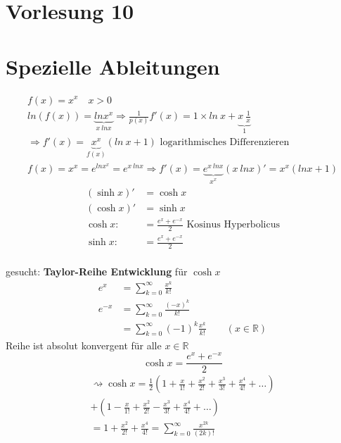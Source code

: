 \section{Vorlesung 10}
\section{Spezielle Ableitungen }
\begin{gather*}
f(x) = x^x \quad x>0\\
ln(f(x)) = \underbrace{ln  x^x}_{x \: ln  x } \Rightarrow \frac{1}{p(x)}f'(x) = 1 \times ln \ x + \underbrace{x \ \frac{1}{x}}_{1}\\
\Rightarrow f'(x) = \underbrace{x^x }_{f(x)}(ln \ x + 1) \text{ logarithmisches Differenzieren }\\
f(x) = x^x = e^{ln  x^x} = e^{x \ ln x} \Rightarrow f'(x)= \underbrace{e^{x \ ln  x}}_{x^x}(x \ ln  x)' = x^x (ln  x + 1) 
\end{gather*}
\begin{align*}
(\sinh  x)'&= \cosh  x\\
(\cosh  x)'&= \sinh x\\
\cosh x:&= \frac{e^x + e^{-x}}{2} \text{ Kosinus Hyperbolicus}\\
\sinh x:&= \frac{e^x + e^{-x}}{2}\\
\end{align*}

gesucht: \textbf{Taylor-Reihe Entwicklung} für $\cosh x$\\
\begin{align*}
e^x &= \sum_{ k = 0 }^{ \infty }{ \frac{x^k}{k!} }\\
e^{-x} &= \sum_{ k = 0 }^{\infty}{\frac{(-x)^k}{k!}}\\
&= \sum_{ k = 0 }^{\infty}{(-1)^k\frac{x^k}{k!}}
\qquad (x \in \mathbb{R})
\end{align*}
Reihe ist absolut konvergent für alle $ x \in \mathbb{R}$ \\
\[\cosh x= \frac{e^x + e^{-x}}{2}\]
\begin{gather*}
\rightsquigarrow \cosh x= \frac{1}{2}(1+\frac{x}{1!}+ \frac{x^2}{2!} + \frac{x^3}{3!}+\frac{x^4}{4!} + \dots )\\
+(1-\frac{x}{1!}+ \frac{x^2}{2!} - \frac{x^3}{3!}+\frac{x^4}{4!} + \dots)\\
=1 + \frac{x^2}{2!}+  \frac{x^4}{4!} = \sum_{k=0}^{\infty}{\frac{x^{2k}}{(2k)!}}
\end{gather*}
